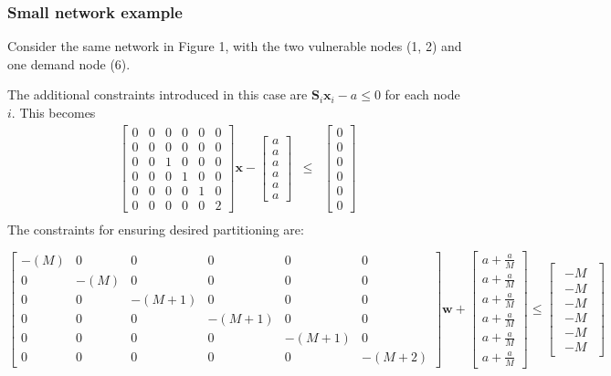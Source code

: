 \documentclass[authoryear,preprint,review,12pt]{elsarticle}
\begin{document}
\subsubsection*{Small network example}

Consider the same network in Figure 1, with the two vulnerable nodes
(1, 2) and one demand node (6).

The additional constraints introduced in this case are $\mathbf{S}_{i}\mathbf{x}_{i}-a\leq0$
for each node $i$. This becomes
\begin{eqnarray*}
\left[\begin{array}{cccccc}
0 & 0 & 0 & 0 & 0 & 0\\
0 & 0 & 0 & 0 & 0 & 0\\
0 & 0 & 1 & 0 & 0 & 0\\
0 & 0 & 0 & 1 & 0 & 0\\
0 & 0 & 0 & 0 & 1 & 0\\
0 & 0 & 0 & 0 & 0 & 2
\end{array}\right]\mathbf{x}-\left[\begin{array}{c}
a\\
a\\
a\\
a\\
a\\
a
\end{array}\right] & \leq & \left[\begin{array}{c}
0\\
0\\
0\\
0\\
0\\
0
\end{array}\right]\\
\end{eqnarray*}
 The constraints for ensuring desired partitioning are:


\[
\left[\begin{array}{cccccc}
-(M) & 0 & 0 & 0 & 0 & 0\\
0 & -(M) & 0 & 0 & 0 & 0\\
0 & 0 & -(M+1) & 0 & 0 & 0\\
0 & 0 & 0 & -(M+1) & 0 & 0\\
0 & 0 & 0 & 0 & -(M+1) & 0\\
0 & 0 & 0 & 0 & 0 & -(M+2)
\end{array}\right]\mathbf{w}+\left[\begin{array}{c}
a+\frac{a}{M}\\
a+\frac{a}{M}\\
a+\frac{a}{M}\\
a+\frac{a}{M}\\
a+\frac{a}{M}\\
a+\frac{a}{M}
\end{array}\right]\leq\left[\begin{array}{c}
\begin{array}{c}
-M\\
-M\\
-M\\
-M\\
-M\\
-M
\end{array}\end{array}\right]
\]
\end{document}
